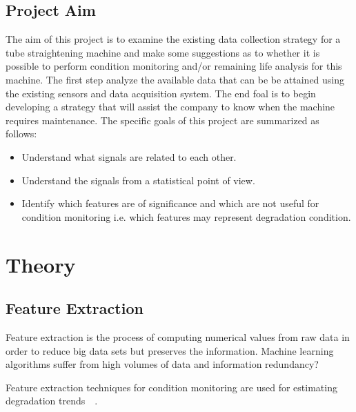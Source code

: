 \documentclass{article}
\begin{document}
\subsection{Project Aim}
The aim of this project is to examine the existing data collection strategy for a tube straightening machine and make some suggestions as to whether it is possible to perform condition monitoring and/or remaining life analysis for this machine. The first step analyze the available data that can be be attained using the existing sensors and data acquisition system. The end foal is to begin developing a strategy that will assist the company to know when the machine requires maintenance. The specific goals of this project are summarized as follows:
\begin{itemize}
\item Understand what signals are related to each other.
\item Understand the signals from a statistical point of view.
\item Identify which features are of significance and which are not useful for condition monitoring i.e. which features may represent degradation condition.
\end{itemize}
\clearpage  
\section{Theory}
\subsection{Feature Extraction}

Feature extraction is the process of computing numerical values from raw data in order to reduce big data sets but preserves the information. Machine learning algorithms suffer from high volumes of data and information redundancy?

Feature extraction techniques for condition monitoring are used for estimating degradation trends~\cite{caesarendra2017review}~\cite{adams2017comparison}.
\end{document}
